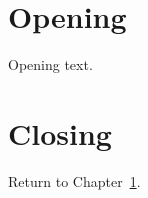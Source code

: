 \documentclass[twoside]{book}
\begin{document}
\frontmatter
\tableofcontents
\mainmatter
\chapter{Opening}\label{chap:opening}
Opening text.
\chapter{Closing}
Return to Chapter~\ref{chap:opening}.
\end{document}
